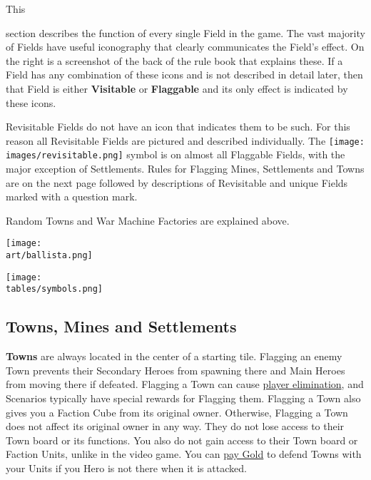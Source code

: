 
\begin{multicols*}{2}

\hypertarget{All}{This} section describes the function of every single Field in the game.
The vast majority of Fields have useful iconography that clearly communicates the Field's effect.
On the right is a screenshot of the back of the rule book that explains these.
If a Field has any combination of these icons and is not described in detail later, then that Field is either \textbf{Visitable} or \textbf{Flaggable} and its only effect is indicated by these icons.\par
Revisitable Fields do not have an icon that indicates them to be such.
For this reason all Revisitable Fields are pictured and described individually.
The \texttt{[image: \\images/revisitable.png]} symbol is on almost all Flaggable Fields, with the major exception of Settlements.
Rules for Flagging Mines, Settlements and Towns are on the next page followed by descriptions of Revisitable and unique Fields marked with a question mark.\par
Random Towns and War Machine Factories are explained above.

\vfill
\begin{center}
  \hspace{-14em}
  \texttt{[image: \\art/ballista.png]}
\end{center}

\begin{center}
  \texttt{[image: \\tables/symbols.png]}
\end{center}

\clearpage
\subsection*{Towns, Mines and Settlements}
\textbf{Towns} are always located in the center of a starting tile.
Flagging an enemy Town prevents their Secondary Heroes from spawning there and Main Heroes from moving there if defeated.
Flagging a Town can cause \hyperlink{End}{player elimination}, and Scenarios typically have special rewards for Flagging them.
Flagging a Town also gives you a Faction Cube from its original owner.
Otherwise, Flagging a Town does not affect its original owner in any way.
They do not lose access to their Town board or its functions.
You also do not gain access to their Town board or Faction Units, unlike in the video game.
You can \hyperlink{Town}{pay Gold} to defend Towns with your Units if you Hero is not there when it is attacked.


\end{multicols*}
